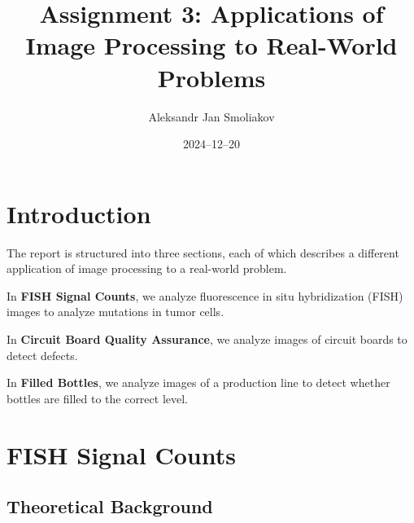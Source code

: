 \documentclass[a4paper,12pt]{article}
\title{Assignment 3: Applications of Image Processing to Real-World Problems}
\author{Aleksandr Jan Smoliakov}
\date{2024--12--20}
\begin{document}
\maketitle

\section{Introduction}

The report is structured into three sections, each of which describes a different application of image processing to a real-world problem.

In \textbf{FISH Signal Counts}, we analyze fluorescence in situ hybridization (FISH) images to analyze mutations in tumor cells.

In \textbf{Circuit Board Quality Assurance}, we analyze images of circuit boards to detect defects.

In \textbf{Filled Bottles}, we analyze images of a production line to detect whether bottles are filled to the correct level.

\newpage

\tableofcontents

\newpage

\section{FISH Signal Counts}

\subsection{Theoretical Background}


\end{document}
